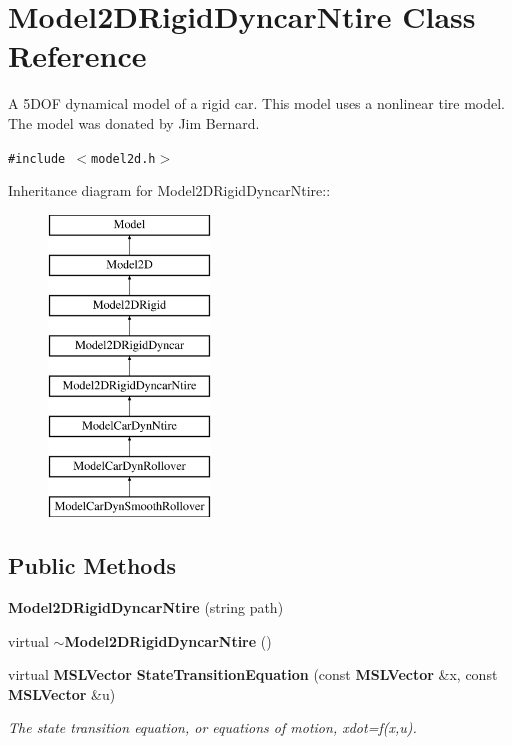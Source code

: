 \section{Model2DRigid\-Dyncar\-Ntire  Class Reference}
\label{classModel2DRigidDyncarNtire}
A 5DOF dynamical model of a rigid car. This model uses a nonlinear tire model. The model was donated by Jim Bernard. 


{\tt \#include $<$model2d.h$>$}

Inheritance diagram for Model2DRigid\-Dyncar\-Ntire::\begin{figure}[H]
\begin{center}
\leavevmode
\includegraphics[height=8cm]{classModel2DRigidDyncarNtire}
\end{center}
\end{figure}
\subsection*{Public Methods}
\begin{CompactItemize}
\item 
{\bf Model2DRigid\-Dyncar\-Ntire} (string path)
\item 
virtual {\bf $\sim$Model2DRigid\-Dyncar\-Ntire} ()
\item 
virtual {\bf MSLVector} {\bf State\-Transition\-Equation} (const {\bf MSLVector} \&x, const {\bf MSLVector} \&u)
\begin{CompactList}\small\item\em The state transition equation, or equations of motion, xdot=f(x,u).\item\end{CompactList}\end{CompactItemize}
